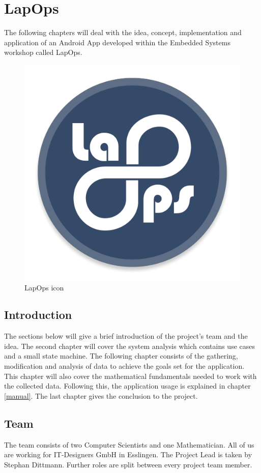\chapter{LapOps}
The following chapters will deal with the idea, concept, implementation and application of an Android App developed within the Embedded Systems workshop called LapOps.
\begin{figure}[H]
	\centering
	\includegraphics[scale= 0.5]{Pictures/lapops-icon.png}
	\caption{LapOps icon}
	\label{icon}
\end{figure}


\section{Introduction}
The sections below will give a brief introduction of the project's team and the idea. The second chapter will cover the system analysis which contains use cases and a small state machine. The following chapter consists of the gathering, modification and analysis of data to achieve the goals set for the application. This chapter will also cover the mathematical fundamentals needed to work with the collected data. Following this, the application usage is explained in chapter \ref{manual}. The last chapter gives the conclusion to the project.

\section{Team}
The team consists of two Computer Scientists and one Mathematician. All of us are working for IT-Designers GmbH in Esslingen. The Project Lead is taken by Stephan Dittmann. Further roles are split between every project team member.


